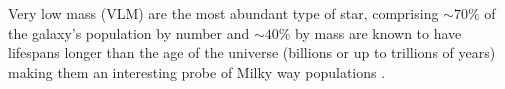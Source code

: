 \documentclass[modern]{aastex62}
\begin{document}
Very low mass (VLM) are the most abundant type of star, comprising $\sim 70 \%$ of the galaxy's population by number \citep{Bochanski:2010} and $\sim 40 \%$ by mass are known to have lifespans longer than the age of the universe (billions or up to trillions of years) \citep{Laughlin:1997} making them an interesting probe of Milky way populations \citep{Bochanski:2007}.
\end{document}
